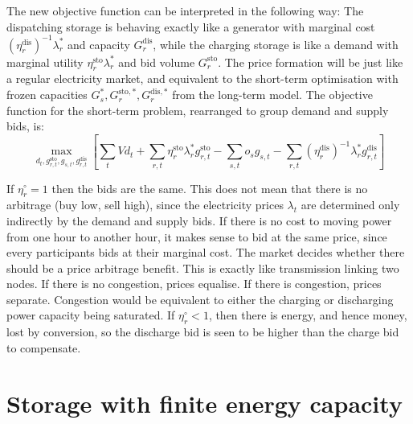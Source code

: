 \documentclass[final,3p]{elsarticle}
\def\l{\lambda} \def\K{\kappa} \def\m{\mu} \def\G{\Gamma} \def\d{\partial}
\begin{document}
The new objective function can be interpreted in the following way: The
dispatching storage is behaving exactly like a generator with marginal cost $
(\eta_r^{\textrm{dis}})^{-1} \lambda^*_r $ and capacity $G^{\textrm{dis}}_{r}$,
while the charging storage is like a demand with marginal utility $
\eta_r^{\textrm{sto}} \lambda^*_r$  and bid volume $G^{\textrm{sto}}_{r}$. The
price formation will be just like a regular electricity market, and equivalent
to the short-term optimisation with frozen capacities
$G^*_s,G^{\textrm{sto},*}_{r},G^{\textrm{dis},*}_{r}$ from the long-term model.
The objective function for the short-term problem, rearranged to group demand
and supply bids, is:
\begin{equation}
  \max_{d_{t},g^{\textrm{sto}}_{r,t}, g_{s,t}, g^{\textrm{dis}}_{r,t}}\left[\sum_{t} Vd_{t} +  \sum_{r,t} \eta_r^{\textrm{sto}}\lambda^*_r g^{\textrm{sto}}_{r,t}   - \sum_{s,t} o_{s} g_{s,t}-\sum_{r,t} (\eta_r^{\textrm{dis}})^{-1}  \lambda^*_r g^{\textrm{dis}}_{r,t} \right]  \label{eq:objst2}
\end{equation}

If $\eta_r^\circ = 1$ then the bids are the same. This does not mean that there
is no arbitrage (buy low, sell high), since the electricity prices $\l_t$ are
determined only indirectly by the demand and supply bids. If there is no cost to
moving power from one hour to another hour, it makes sense to bid at the same
price, since every participants bids at their marginal cost. The market decides
whether there should be a price arbitrage benefit. This is exactly like
transmission linking two nodes. If there is no congestion, prices equalise. If
there is congestion, prices separate. Congestion would be equivalent to either
the charging or discharging power capacity being saturated.
If $\eta_r^\circ < 1$, then there is energy, and hence money, lost by
conversion, so the discharge bid is seen to be higher than the charge bid to
compensate.

\section*{Storage with finite energy capacity}
\end{document}
